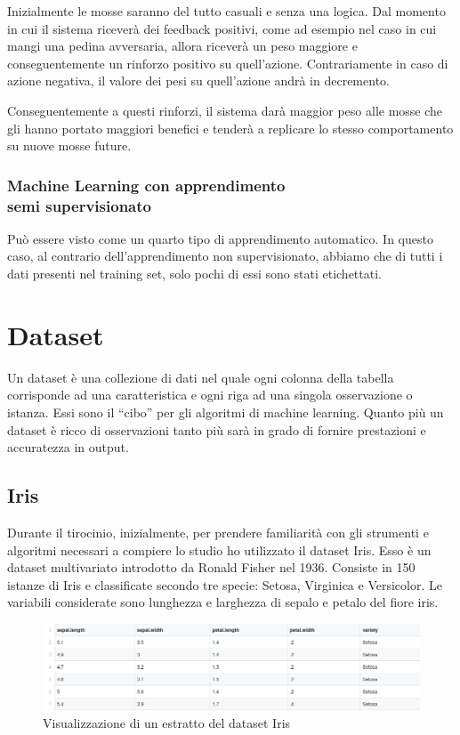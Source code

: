 \documentclass[12pt,italian]{report}
\begin{document}
Inizialmente le mosse saranno del tutto casuali e senza una logica. Dal momento in cui il sistema riceverà dei feedback positivi, come ad esempio nel caso in cui mangi una pedina avversaria, allora riceverà un peso maggiore e conseguentemente un rinforzo positivo su quell’azione. Contrariamente in caso di azione negativa, il valore dei pesi su quell’azione andrà in decremento.

Conseguentemente a questi rinforzi, il sistema darà maggior peso alle mosse che gli hanno portato maggiori benefici e tenderà a replicare lo stesso comportamento su nuove mosse future.
\subsection{Machine Learning con apprendimento\\ semi supervisionato}
Può essere visto come un quarto tipo di apprendimento automatico. In questo caso, al contrario dell’apprendimento non supervisionato, abbiamo che di tutti i dati presenti nel training set, solo pochi di essi sono stati etichettati.



\chapter{Dataset}
Un dataset è una collezione di dati nel quale ogni colonna della tabella corrisponde ad una caratteristica e ogni riga ad una singola osservazione o istanza. Essi sono il ``cibo'' per gli algoritmi di machine learning. Quanto più un dataset è ricco di osservazioni tanto più sarà in grado di fornire prestazioni e accuratezza in output.

\section{Iris}
Durante il tirocinio, inizialmente, per prendere familiarità con gli strumenti e algoritmi necessari a compiere lo studio ho utilizzato il dataset Iris. Esso è un dataset multivariato introdotto da Ronald Fisher nel 1936. Consiste in 150 istanze di Iris e classificate secondo tre specie: Setosa, Virginica e Versicolor.
Le variabili considerate sono lunghezza e larghezza di sepalo e petalo del fiore iris.
\begin{figure}[h]
	\centering
	\includegraphics[width = 150mm]{immagini/Iris}
	\caption{Visualizzazione di un estratto del dataset Iris}
\end{figure}
\end{document}
